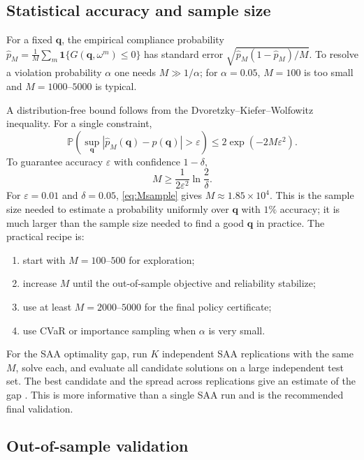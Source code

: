 \documentclass[11pt]{article}
\numberwithin{equation}{section}
\newcommand{\Prob}{\mathbb{P}}
\newcommand{\abs}[1]{\left\lvert #1 \right\rvert}
\newcommand{\ind}{\mathbf{1}}
\theoremstyle{plain}
\begin{document}
\subsection{Statistical accuracy and sample size}
\label{sec:samplesize}

For a fixed $\mathbf{q}$, the empirical compliance probability
$\hat p_M=\frac{1}{M}\sum_m\ind\{G(\mathbf{q},\omega^m)\le0\}$ has standard
error $\sqrt{\hat p_M(1-\hat p_M)/M}$.  To resolve a violation probability
$\alpha$ one needs $M\gg1/\alpha$; for $\alpha=0.05$, $M=100$ is too small and
$M=1000$--$5000$ is typical.

A distribution-free bound follows from the Dvoretzky--Kiefer--Wolfowitz
inequality.  For a single constraint,
\begin{equation}
\label{eq:dkw}
\Prob\left(\sup_{\mathbf{q}}\abs{\hat p_M(\mathbf{q})-p(\mathbf{q})}
>\varepsilon\right)
\le2\exp(-2M\varepsilon^2).
\end{equation}
To guarantee accuracy $\varepsilon$ with confidence $1-\delta$,
\begin{equation}
\label{eq:Msample}
M\ge\frac{1}{2\varepsilon^2}\ln\frac{2}{\delta}.
\end{equation}
For $\varepsilon=0.01$ and $\delta=0.05$, \eqref{eq:Msample} gives
$M\approx1.85\times10^4$.  This is the sample size needed to estimate a
probability uniformly over $\mathbf{q}$ with $1\%$ accuracy; it is much larger
than the sample size needed to find a good $\mathbf{q}$ in practice.  The
practical recipe is:
\begin{enumerate}[leftmargin=1.6em,itemsep=2pt]
  \item start with $M=100$--$500$ for exploration;
  \item increase $M$ until the out-of-sample objective and reliability
        stabilize;
  \item use at least $M=2000$--$5000$ for the final policy certificate;
  \item use CVaR or importance sampling when $\alpha$ is very small.
\end{enumerate}

For the SAA optimality gap, run $K$ independent SAA replications with the same
$M$, solve each, and evaluate all candidate solutions on a large independent
test set.  The best candidate and the spread across replications give an
estimate of the gap \citep{kleywegt2002}.  This is more informative than a
single SAA run and is the recommended final validation.

\subsection{Out-of-sample validation}
\end{document}
